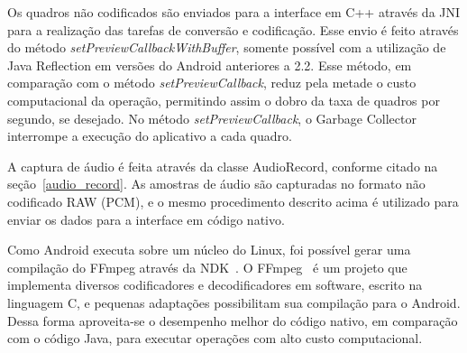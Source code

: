 \documentclass{acm_proc_article-sp}
\begin{document}

Os quadros não codificados são enviados para a interface em C++ através da JNI para a realização das tarefas de conversão e codificação. Esse envio é feito através do método \emph{setPreviewCallbackWithBuffer}, somente possível com a utilização de Java Reflection em versões do Android anteriores a 2.2. Esse método, em comparação com o método \emph{setPreviewCallback}, reduz pela metade o custo computacional da operação, permitindo assim o dobro da taxa de quadros por segundo, se desejado. No método \emph{setPreviewCallback}, o Garbage Collector interrompe a execução do aplicativo a cada quadro.


A captura de áudio é feita através da classe AudioRecord, conforme citado na seção~\ref{audio_record}. As amostras de áudio são capturadas no formato não codificado RAW (PCM), e o mesmo procedimento descrito acima é utilizado para enviar os dados para a interface em código nativo.


Como Android executa sobre um núcleo do Linux, foi possível gerar uma compilação do FFmpeg através da NDK~\cite{fu_2010}. O FFmpeg~\cite{ffmpeg} é um projeto que implementa diversos codificadores e decodificadores em software, escrito na linguagem C, e pequenas adaptações possibilitam sua compilação para o Android. Dessa forma aproveita-se o desempenho melhor do código nativo, em comparação com o código Java, para executar operações com alto custo computacional.
\end{document}
